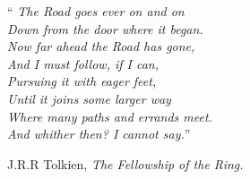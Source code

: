 \documentclass[
12pt, %
english, brazil, %
doublespacing,
nolistspacing, %
liststotoc, %
]{MastersDoctoralThesis} %
\begin{document}
\vspace*{0.2\textheight}
\begin{center}
\noindent\enquote{\itshape
    The Road goes ever on and on \\
    		Down from the door where it began. \\
    Now far ahead the Road has gone, \\
    		And I must follow, if I can, \\
    Pursuing it with eager feet, \\
    		Until it joins some larger way \\
    Where many paths and errands meet. \\
    		And whither then? I cannot say.}\bigbreak

 J.R.R Tolkien, \textit{The Fellowship of the Ring.}
\end{center}
\cleardoublepage
\end{document}
